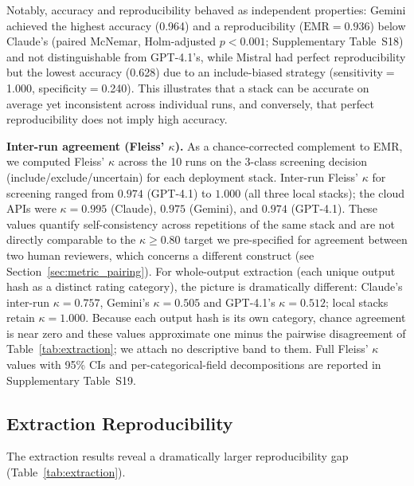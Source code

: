 \documentclass[preprint,review,12pt,authoryear]{elsarticle}
\newcommand{\emr}{\textrm{EMR}}
\begin{document}
Notably, accuracy and reproducibility behaved as independent properties: Gemini achieved the highest accuracy (0.964) and a reproducibility ($\emr{=}0.936$) below Claude's (paired McNemar, Holm-adjusted $p{<}0.001$; Supplementary Table~S18) and not distinguishable from GPT-4.1's, while Mistral had perfect reproducibility but the lowest accuracy (0.628) due to an include-biased strategy (sensitivity${=}$1.000, specificity${=}$0.240).
This illustrates that a stack can be accurate on average yet inconsistent across individual runs, and conversely, that perfect reproducibility does not imply high accuracy.

\medskip
\noindent\textbf{Inter-run agreement (Fleiss' $\kappa$).}
As a chance-corrected complement to EMR, we computed Fleiss' $\kappa$ across the 10 runs on the 3-class screening decision (include/exclude/uncertain) for each deployment stack.
Inter-run Fleiss' $\kappa$ for screening ranged from $0.974$ (GPT-4.1) to $1.000$ (all three local stacks); the cloud APIs were $\kappa{=}0.995$ (Claude), $0.975$ (Gemini), and $0.974$ (GPT-4.1).
These values quantify self-consistency across repetitions of the same stack and are not directly comparable to the $\kappa{\geq}0.80$ target we pre-specified for agreement between two human reviewers, which concerns a different construct (see Section~\ref{sec:metric_pairing}).
For whole-output extraction (each unique output hash as a distinct rating category), the picture is dramatically different: Claude's inter-run $\kappa{=}0.757$, Gemini's $\kappa{=}0.505$ and GPT-4.1's $\kappa{=}0.512$; local stacks retain $\kappa{=}1.000$. Because each output hash is its own category, chance agreement is near zero and these values approximate one minus the pairwise disagreement of Table~\ref{tab:extraction}; we attach no descriptive band to them.
Full Fleiss' $\kappa$ values with 95\% CIs and per-categorical-field decompositions are reported in Supplementary Table~S19.

\subsection{Extraction Reproducibility}

The extraction results reveal a dramatically larger reproducibility gap (Table~\ref{tab:extraction}).
\end{document}
